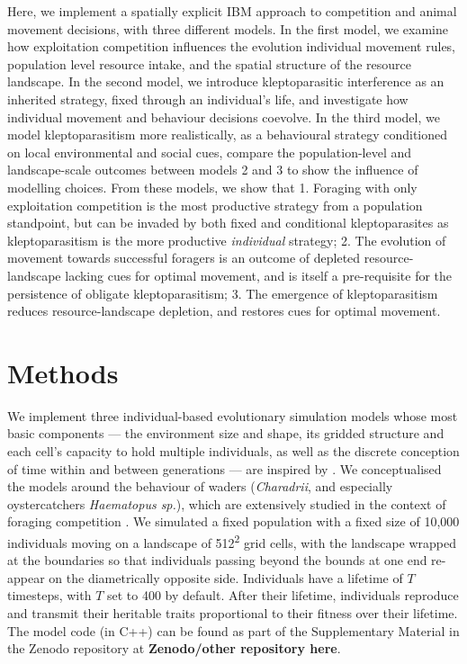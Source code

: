 \documentclass[11pt]{article}
\begin{document}
Here, we implement a spatially explicit IBM approach to competition and animal movement decisions, with three different models.
In the first model, we examine how exploitation competition influences the evolution individual movement rules, population level resource intake, and the spatial structure of the resource landscape.
In the second model, we introduce kleptoparasitic interference as an inherited strategy, fixed through an individual's life, and investigate how individual movement and behaviour decisions coevolve.
In the third model, we model kleptoparasitism more realistically, as a behavioural strategy conditioned on local environmental and social cues, compare the population-level and landscape-scale outcomes between models 2 and 3 to show the influence of modelling choices.
From these models, we show that 1. Foraging with only exploitation competition is the most productive strategy from a population standpoint, but can be invaded by both fixed and conditional kleptoparasites as kleptoparasitism is the more productive \textit{individual} strategy;
2. The evolution of movement towards successful foragers is an outcome of depleted resource-landscape lacking cues for optimal movement, and is itself a pre-requisite for the persistence of obligate kleptoparasitism;
3. The emergence of kleptoparasitism reduces resource-landscape depletion, and restores cues for optimal movement. 

\section{Methods}

We implement three individual-based evolutionary simulation models whose most basic components --- the environment size and shape, its gridded structure and each cell's capacity to hold multiple individuals, as well as the discrete conception of time within and between generations --- are inspired by \citet{netz2020}.
We conceptualised the models around the behaviour of waders (\textit{Charadrii}, and especially oystercatchers \textit{Haematopus sp.}), which are extensively studied in the context of foraging competition \citep[e.g.][]{vahl2005, vahl2005b, vahl2007, ENS1990219, rutten2010a, rutten2010}.
We simulated a fixed population with a fixed size of 10,000 individuals moving on a landscape of 512\textsuperscript{2} grid cells, with the landscape wrapped at the boundaries so that individuals passing beyond the bounds at one end re-appear on the diametrically opposite side.
Individuals have a lifetime of $T$ timesteps, with $T$ set to 400 by default.
After their lifetime, individuals reproduce and transmit their heritable traits proportional to their fitness over their lifetime.
The model code (in C++) can be found as part of the Supplementary Material in the Zenodo repository at \textbf{Zenodo/other repository here}.
\end{document}
